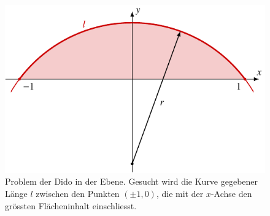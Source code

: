 %
%
%
\begin{figure}
\centering
\includegraphics{chapters/050-nebenbedingungen/images/dido.pdf}
\caption{Problem der Dido in der Ebene.
Gesucht wird die Kurve gegebener Länge $l$ zwischen den Punkten $(\pm 1,0)$,
die mit der $x$-Achse den grössten Flächeninhalt einschliesst.
\label{buch:nebenbedingungen:lagrangemult:fig:dido}}
\end{figure}
